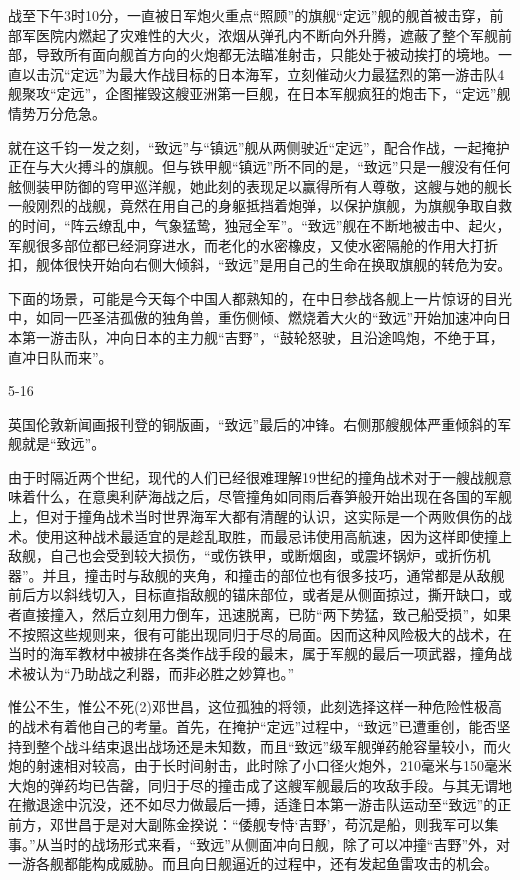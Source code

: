 \documentclass[12pt,UTF8]{ctexbook}
\begin{document}
战至下午3时10分，一直被日军炮火重点“照顾”的旗舰“定远”舰的舰首被击穿，前部军医院内燃起了灾难性的大火，浓烟从弹孔内不断向外升腾，遮蔽了整个军舰前部，导致所有面向舰首方向的火炮都无法瞄准射击，只能处于被动挨打的境地。一直以击沉“定远”为最大作战目标的日本海军，立刻催动火力最猛烈的第一游击队4舰聚攻“定远”，企图摧毁这艘亚洲第一巨舰，在日本军舰疯狂的炮击下，“定远”舰情势万分危急。

就在这千钧一发之刻，“致远”与“镇远”舰从两侧驶近“定远”，配合作战，一起掩护正在与大火搏斗的旗舰。但与铁甲舰“镇远”所不同的是，“致远”只是一艘没有任何舷侧装甲防御的穹甲巡洋舰，她此刻的表现足以赢得所有人尊敬，这艘与她的舰长一般刚烈的战舰，竟然在用自己的身躯抵挡着炮弹，以保护旗舰，为旗舰争取自救的时间，“阵云缭乱中，气象猛鸷，独冠全军”。“致远”舰在不断地被击中、起火，军舰很多部位都已经洞穿进水，而老化的水密橡皮，又使水密隔舱的作用大打折扣，舰体很快开始向右侧大倾斜，“致远”是用自己的生命在换取旗舰的转危为安。

下面的场景，可能是今天每个中国人都熟知的，在中日参战各舰上一片惊讶的目光中，如同一匹圣洁孤傲的独角兽，重伤侧倾、燃烧着大火的“致远”开始加速冲向日本第一游击队，冲向日本的主力舰“吉野”，“鼓轮怒驶，且沿途鸣炮，不绝于耳，直冲日队而来”。

5-16

英国伦敦新闻画报刊登的铜版画，“致远”最后的冲锋。右侧那艘舰体严重倾斜的军舰就是“致远”。

由于时隔近两个世纪，现代的人们已经很难理解19世纪的撞角战术对于一艘战舰意味着什么，在意奥利萨海战之后，尽管撞角如同雨后春笋般开始出现在各国的军舰上，但对于撞角战术当时世界海军大都有清醒的认识，这实际是一个两败俱伤的战术。使用这种战术最适宜的是趁乱取胜，而最忌讳使用高航速，因为这样即使撞上敌舰，自己也会受到较大损伤，“或伤铁甲，或断烟囱，或震坏锅炉，或折伤机器”。并且，撞击时与敌舰的夹角，和撞击的部位也有很多技巧，通常都是从敌舰前后方以斜线切入，目标直指敌舰的锚床部位，或者是从侧面掠过，撕开缺口，或者直接撞入，然后立刻用力倒车，迅速脱离，已防“两下势猛，致己船受损”，如果不按照这些规则来，很有可能出现同归于尽的局面。因而这种风险极大的战术，在当时的海军教材中被排在各类作战手段的最末，属于军舰的最后一项武器，撞角战术被认为“乃助战之利器，而非必胜之妙算也。”

惟公不生，惟公不死(2)邓世昌，这位孤独的将领，此刻选择这样一种危险性极高的战术有着他自己的考量。首先，在掩护“定远”过程中，“致远”已遭重创，能否坚持到整个战斗结束退出战场还是未知数，而且“致远”级军舰弹药舱容量较小，而火炮的射速相对较高，由于长时间射击，此时除了小口径火炮外，210毫米与150毫米大炮的弹药均已告罄，同归于尽的撞击成了这艘军舰最后的攻敌手段。与其无谓地在撤退途中沉没，还不如尽力做最后一搏，适逢日本第一游击队运动至“致远”的正前方，邓世昌于是对大副陈金揆说：“倭舰专恃‘吉野’，苟沉是船，则我军可以集事。”从当时的战场形式来看，“致远”从侧面冲向日舰，除了可以冲撞“吉野”外，对一游各舰都能构成威胁。而且向日舰逼近的过程中，还有发起鱼雷攻击的机会。
\end{document}
